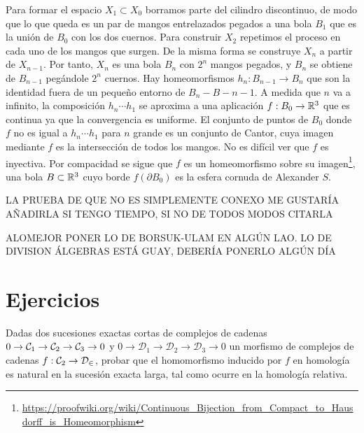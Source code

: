 \documentclass[TA.tex]{subfiles}
\begin{document}
\begin{ej}
Para formar el espacio $X_1\subset X_0$ borramos parte del cilindro discontinuo, de modo que lo que queda es un par de mangos entrelazados pegados a una bola $B_1$  que es la unión de $B_0$ con los dos cuernos. Para construir $X_2$ repetimos el proceso en cada uno de los mangos que surgen. De la misma forma se construye $X_n$ a partir de $X_{n-1}$. Por tanto, $X_n$ es una bola $B_n$ con $2^n$ mangos pegados, y $B_n$ se obtiene de $B_{n-1}$ pegándole $2^n$ cuernos. Hay homeomorfismos $h_n:B_{n-1}\to B_n$ que son la identidad fuera de un pequeño entorno de $B_n-B-{n-1}$. A medida que $n$ va a infinito, la composición $h_n\cdots h_1$ se aproxima a una aplicación $f:B_0\to\mathbb{R}^3$ que es continua ya que la convergencia es uniforme. El conjunto de puntos de $B_0$ donde $f$ no es igual a $h_n\cdots h_1$ para $n$ grande es un conjunto de Cantor, cuya imagen mediante $f$ es la intersección de todos los mangos. No es difícil ver que $f$ es inyectiva. Por compacidad se sigue que $f$ es un homeomorfismo sobre su imagen\footnote{\url{https://proofwiki.org/wiki/Continuous_Bijection_from_Compact_to_Hausdorff_is_Homeomorphism}}, una bola $B\subset\mathbb{R}^3$ cuyo borde $f(\partial B_0)$ es la esfera cornuda de Alexander $S$.


LA PRUEBA DE QUE NO ES SIMPLEMENTE CONEXO ME GUSTARÍA AÑADIRLA SI TENGO TIEMPO, SI NO DE TODOS MODOS CITARLA  
\end{ej}

ALOMEJOR PONER LO DE BORSUK-ULAM EN ALGÚN LAO. LO DE DIVISION ÁLGEBRAS ESTÁ GUAY, DEBERÍA PONERLO ALGÚN DÍA


\section{Ejercicios}
\begin{ejer}
Dadas dos sucesiones exactas cortas de complejos de cadenas $0\to \mathcal{C}_1\to \mathcal{C}_2\to\mathcal{C}_3\to 0$ y $0\to \mathcal{D}_1\to \mathcal{D}_2\to\mathcal{D}_3\to 0$ un morfismo de complejos de cadenas $f:\mathcal{C}_2\to\mathcal{D_2}$, probar que el homomorfismo inducido por $f$ en homología es natural en la sucesión exacta larga, tal como ocurre en la homología relativa. 
\end{ejer}
\end{document}
